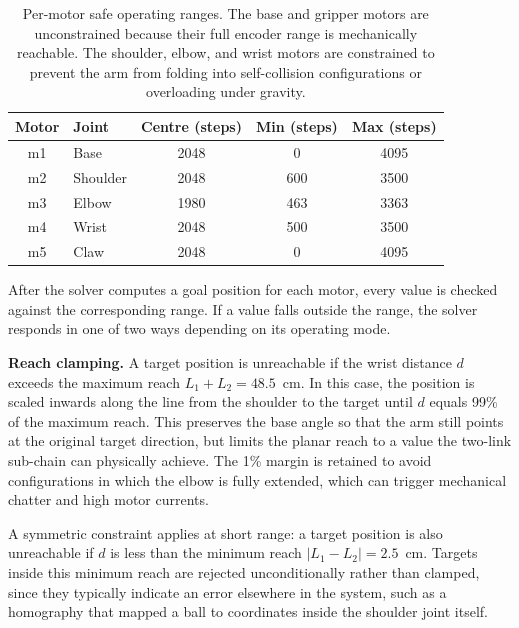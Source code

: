 \begin{table}[H]
    \centering
    \renewcommand{\arraystretch}{1.3}
    \begin{tabular}{|c|l|c|c|c|}
        \hline
        \textbf{Motor} & \textbf{Joint} & 
        \textbf{Centre (steps)} & 
        \textbf{Min (steps)} & \textbf{Max (steps)} \\
        \hline
        m1 & Base    & 2048 & 0    & 4095 \\
        \hline
        m2 & Shoulder & 2048 & 600  & 3500 \\
        \hline
        m3 & Elbow   & 1980 & 463  & 3363 \\
        \hline
        m4 & Wrist   & 2048 & 500  & 3500 \\
        \hline
        m5 & Claw    & 2048 & 0    & 4095 \\
        \hline
    \end{tabular}
    \caption{Per-motor safe operating ranges. The base and gripper 
    motors are unconstrained because their full encoder range is 
    mechanically reachable. The shoulder, elbow, and wrist motors 
    are constrained to prevent the arm from folding into 
    self-collision configurations or overloading under gravity.}
    \label{tab:joint_limits}
\end{table}

After the solver computes a goal position for each motor, every 
value is checked against the corresponding range. If a value 
falls outside the range, the solver responds in one of two ways 
depending on its operating mode.

\textbf{Reach clamping.} A target position is unreachable if 
the wrist distance $d$ exceeds the maximum reach 
$L_1 + L_2 = 48.5$~cm. In this case, the position is scaled 
inwards along the line from the shoulder to the target until $d$ 
equals 99\% of the maximum reach. This preserves the base angle 
so that the arm still points at the original target direction, 
but limits the planar reach to a value the two-link sub-chain 
can physically achieve. The 1\% margin is retained to avoid 
configurations in which the elbow is fully extended, which can 
trigger mechanical chatter and high motor currents.

A symmetric constraint applies at short range: a target 
position is also unreachable if $d$ is less than the minimum 
reach $|L_1 - L_2| = 2.5$~cm. Targets inside this minimum reach 
are rejected unconditionally rather than clamped, since they 
typically indicate an error elsewhere in the system, such as a 
homography that mapped a ball to coordinates inside the 
shoulder joint itself.

